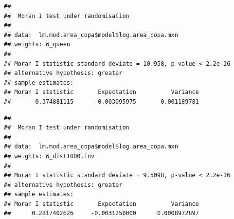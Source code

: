 \documentclass[12pt,]{book}
\newenvironment{Shaded}{\begin{snugshade}}{\end{snugshade}}
\newcommand{\KeywordTok}[1]{\textcolor[rgb]{0.13,0.29,0.53}{\textbf{#1}}}
\newcommand{\DataTypeTok}[1]{\textcolor[rgb]{0.13,0.29,0.53}{#1}}
\newcommand{\OtherTok}[1]{\textcolor[rgb]{0.56,0.35,0.01}{#1}}
\newcommand{\OperatorTok}[1]{\textcolor[rgb]{0.81,0.36,0.00}{\textbf{#1}}}
\newcommand{\NormalTok}[1]{#1}
\begin{document}
\begin{Shaded}
\end{Shaded}

\begin{verbatim}
## 
##  Moran I test under randomisation
## 
## data:  lm.mod.area_copa$model$log.area_copa.mxn  
## weights: W_queen  
## 
## Moran I statistic standard deviate = 10.958, p-value < 2.2e-16
## alternative hypothesis: greater
## sample estimates:
## Moran I statistic       Expectation          Variance 
##       0.374881115      -0.003095975       0.001189781
\end{verbatim}

\begin{Shaded}
\end{Shaded}

\begin{verbatim}
## 
##  Moran I test under randomisation
## 
## data:  lm.mod.area_copa$model$log.area_copa.mxn  
## weights: W_dist1000.inv  
## 
## Moran I statistic standard deviate = 9.5098, p-value < 2.2e-16
## alternative hypothesis: greater
## sample estimates:
## Moran I statistic       Expectation          Variance 
##      0.2817402626     -0.0031250000      0.0008972897
\end{verbatim}
\end{document}
